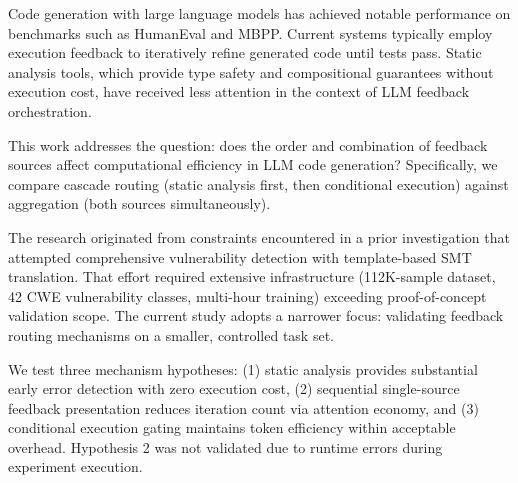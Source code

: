 
Code generation with large language models has achieved notable performance on benchmarks such as HumanEval and MBPP. Current systems typically employ execution feedback to iteratively refine generated code until tests pass. Static analysis tools, which provide type safety and compositional guarantees without execution cost, have received less attention in the context of LLM feedback orchestration.

This work addresses the question: does the order and combination of feedback sources affect computational efficiency in LLM code generation? Specifically, we compare cascade routing (static analysis first, then conditional execution) against aggregation (both sources simultaneously).

The research originated from constraints encountered in a prior investigation that attempted comprehensive vulnerability detection with template-based SMT translation. That effort required extensive infrastructure (112K-sample dataset, 42 CWE vulnerability classes, multi-hour training) exceeding proof-of-concept validation scope. The current study adopts a narrower focus: validating feedback routing mechanisms on a smaller, controlled task set.

We test three mechanism hypotheses: (1) static analysis provides substantial early error detection with zero execution cost, (2) sequential single-source feedback presentation reduces iteration count via attention economy, and (3) conditional execution gating maintains token efficiency within acceptable overhead. Hypothesis 2 was not validated due to runtime errors during experiment execution.
